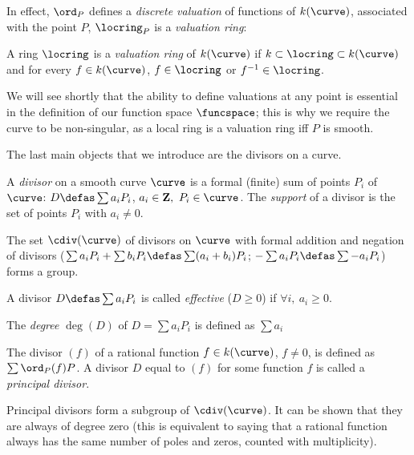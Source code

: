 In effect, $\ord_P$ defines a \emph{discrete valuation} of functions of $k(\curve)$, associated with the point $P$, \ie $\locring_P$ is a \emph{valuation ring}:

\begin{defi}
A ring $\locring$ is a \emph{valuation ring} of $k(\curve)$ if $k \subset \locring \subset k(\curve)$  and for every $f \in k(\curve)$,
$f \in \locring$ or $f^{-1} \in \locring$.
\end{defi}

We will see shortly that the ability to define valuations at any point is essential
in the definition of our function space $\funcspace$; this is why we require the curve to be non-singular, as a local ring is a valuation ring iff $P$ is smooth.

\medskip

The last main objects that we introduce are the divisors on a curve.

\begin{defi}[Divisor]
A \emph{divisor} on a smooth curve $\curve$ is a formal (finite) sum of points $P_i$ of $\curve$: $D \defas \sum a_iP_i$, $a_i \in \mathbf{Z},~P_i \in \curve$.
The \emph{support} of a divisor is the set of points $P_i$ with $a_i \neq 0$.

\noindent
The set $\cdiv(\curve)$ of divisors on $\curve$ with formal addition and negation of divisors ($\sum a_iP_i + \sum b_iP_i \defas \sum (a_i+b_i)P_i$;
$-\sum a_iP_i \defas \sum -a_iP_i$) forms a group.

\noindent
A divisor $D \defas \sum a_iP_i$ is called \emph{effective} ($D \geq 0$) if $\forall i,~a_i \geq 0$.

\noindent
The \emph{degree} $\deg(D)$ of $D = \sum a_iP_i$ is defined as $\sum a_i$
\end{defi}

\begin{defi}
The divisor $(f)$ of a rational function $f \in k(\curve)$, $f \neq 0$, is defined as $\sum \ord_P(f)P$.
A divisor $D$ equal to $(f)$ for some function $f$ is called a \emph{principal divisor}.
\end{defi}

Principal divisors form a subgroup of $\cdiv(\curve)$. It can be shown that they are always of degree zero
(this is equivalent to saying that a rational function always has the same number of poles and zeros, counted with
multiplicity).

